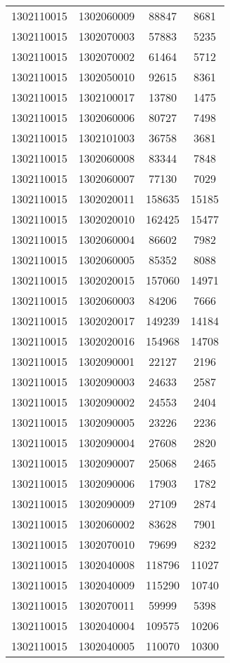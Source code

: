 \begin{longtable}{llcc}
1302110015 & 1302060009 & 88847 & 8681\\
1302110015 & 1302070003 & 57883 & 5235\\
1302110015 & 1302070002 & 61464 & 5712\\
1302110015 & 1302050010 & 92615 & 8361\\
1302110015 & 1302100017 & 13780 & 1475\\
1302110015 & 1302060006 & 80727 & 7498\\
1302110015 & 1302101003 & 36758 & 3681\\
1302110015 & 1302060008 & 83344 & 7848\\
1302110015 & 1302060007 & 77130 & 7029\\
1302110015 & 1302020011 & 158635 & 15185\\
1302110015 & 1302020010 & 162425 & 15477\\
1302110015 & 1302060004 & 86602 & 7982\\
1302110015 & 1302060005 & 85352 & 8088\\
1302110015 & 1302020015 & 157060 & 14971\\
1302110015 & 1302060003 & 84206 & 7666\\
1302110015 & 1302020017 & 149239 & 14184\\
1302110015 & 1302020016 & 154968 & 14708\\
1302110015 & 1302090001 & 22127 & 2196\\
1302110015 & 1302090003 & 24633 & 2587\\
1302110015 & 1302090002 & 24553 & 2404\\
1302110015 & 1302090005 & 23226 & 2236\\
1302110015 & 1302090004 & 27608 & 2820\\
1302110015 & 1302090007 & 25068 & 2465\\
1302110015 & 1302090006 & 17903 & 1782\\
1302110015 & 1302090009 & 27109 & 2874\\
1302110015 & 1302060002 & 83628 & 7901\\
1302110015 & 1302070010 & 79699 & 8232\\
1302110015 & 1302040008 & 118796 & 11027\\
1302110015 & 1302040009 & 115290 & 10740\\
1302110015 & 1302070011 & 59999 & 5398\\
1302110015 & 1302040004 & 109575 & 10206\\
1302110015 & 1302040005 & 110070 & 10300\\

\end{longtable}
